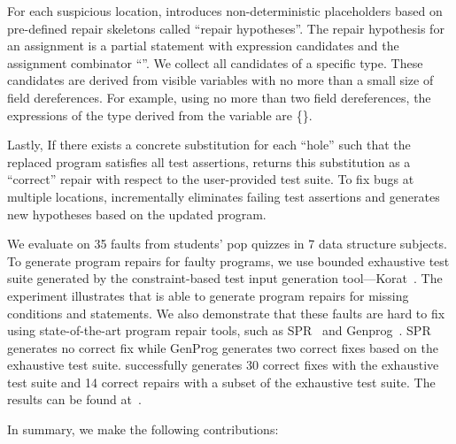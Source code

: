 For each suspicious location, \tool introduces  non-deterministic placeholders based on pre-defined  repair skeletons called ``repair hypotheses''.  The repair  hypothesis for an assignment is a partial statement with expression candidates  and  the assignment combinator ``\codefont{=}''.   We collect all  candidates of a specific type. These candidates are derived from visible variables with no more than a small size of field dereferences.    For example, using no more than two field dereferences, the expressions of the type  derived from the variable   are \{\}.   


Lastly,    If there exists a concrete substitution for each ``hole'' such that the replaced program  satisfies all test assertions, \tool  returns this substitution as a ``correct'' repair with respect to the user-provided test suite. To fix bugs at multiple locations,  \tool incrementally  eliminates failing test assertions and generates new hypotheses based on the updated program. 

We evaluate \tool on 35 faults from students' pop quizzes in  7 data structure subjects. To generate program repairs for faulty programs, we  use bounded exhaustive test suite generated by the  constraint-based test input generation tool---Korat~\cite{korat:issta02}.  
The experiment illustrates that  \tool is able to generate program repairs for  missing conditions and statements.  We also demonstrate that these faults are hard to fix using state-of-the-art program repair tools,  such as SPR~\cite{spr:fse15} and Genprog~\cite{genprog:tse12}.  SPR generates no correct fix while GenProg generates two correct fixes based on the exhaustive test suite. \tool successfully generates 30 correct fixes with the exhaustive test suite and 14 correct repairs with a subset of the exhaustive test suite. The results can be found at~\cite{git:compareRepo}. 

In summary, we make the following contributions: 


